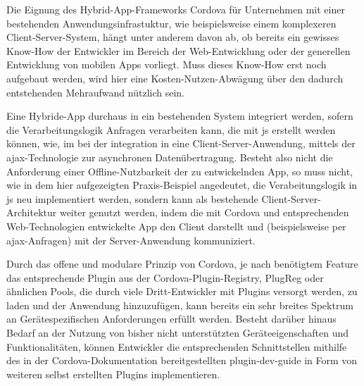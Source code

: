 
Die Eignung des Hybrid-App-Frameworks Cordova für Unternehmen mit einer bestehenden Anwendungsinfrastuktur, wie beispielsweise einem komplexeren Client-Server-System, hängt unter anderem davon ab, ob bereits ein gewisses Know-How der Entwickler im Bereich der Web-Entwicklung oder der generellen Entwicklung von mobilen Apps vorliegt. 
Muss dieses Know-How erst noch aufgebaut werden, wird hier eine Kosten-Nutzen-Abwägung über den dadurch entstehenden Mehraufwand nützlich sein.


Eine Hybride-App durchaus in ein bestehenden System integriert werden, sofern die Verarbeitungslogik Anfragen verarbeiten kann, die mit \gls{js} erstellt werden können, wie, im \zB bei der integration in eine Client-Server-Anwendung, mittels der \gls{ajax}-Technologie zur asynchronen Datenübertragung.
Besteht also nicht die Anforderung einer Offline-Nutzbarkeit der zu entwickelnden App, so muss nicht, wie in dem hier aufgezeigten Praxis-Beispiel angedeutet, die Verabeitungslogik in \gls{js} neu implementiert werden, sondern kann als bestehende Client-Server-Architektur weiter genutzt werden, indem die mit Cordova und entsprechenden Web-Technologien entwickelte App den Client darstellt und (beispielsweise per \gls{ajax}-Anfragen) mit der Server-Anwendung kommuniziert.



Durch das offene und modulare Prinzip von Cordova, je nach benötigtem Feature das entsprechende Plugin aus der Cordova-Plugin-Registry, PlugReg oder ähnlichen Pools, die durch viele Dritt-Entwickler mit Plugins versorgt werden, zu laden und der Anwendung hinzuzufügen, kann bereits ein sehr breites Spektrum an Gerätespezifischen Anforderungen erfüllt werden.
Besteht darüber hinaus Bedarf an der Nutzung von bisher nicht unterstützten Geräteeigenschaften und Funktionalitäten, können Entwickler die entsprechenden Schnittstellen mithilfe des in der Cordova-Dokumentation bereitgestellten \gls{plugin-dev-guide} in Form von weiteren selbst erstellten Plugins implementieren. 



